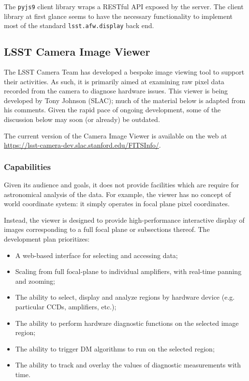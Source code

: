 The \texttt{pyjs9} client library wraps a RESTful API exposed by the server.
The client library at first glance seems to have the necessary functionality to implement most of the standard \texttt{lsst.afw.display} back end.


\subsection{LSST Camera Image Viewer}
\label{sec:existing_tools:camera}

The LSST Camera Team has developed a bespoke image viewing tool to support their activities.
As such, it is primarily aimed at examining raw pixel data recorded from the camera to diagnose hardware issues.
This viewer is being developed by Tony Johnson (SLAC); much of the material below is adapted from his comments.
Given the rapid pace of ongoing development, some of the discussion below may soon (or already) be outdated.

The current version of the Camera Image Viewer is available on the web at \url{https://lsst-camera-dev.slac.stanford.edu/FITSInfo/}.

\subsubsection{Capabilities}

Given its audience and goals, it does not provide facilities which are require for astronomical analysis of the data.
For example, the viewer has no concept of world coordinate system: it simply operates in focal plane pixel coordinates.

Instead, the viewer is designed to provide high-performance interactive display of images corresponding to a full focal plane or subsections thereof.
The development plan prioritizes:

\begin{itemize}

  \item{A web-based interface for selecting and accessing data;}
  \item{Scaling from full focal-plane to individual amplifiers, with real-time panning and zooming;}
  \item{The ability to select, display and analyze regions by hardware device (e.g. particular CCDs, amplifiers, etc.);}
  \item{The ability to perform hardware diagnostic functions on the selected image region;}
  \item{The ability to trigger DM algorithms to run on the selected region;}
  \item{The ability to track and overlay the values of diagnostic measurements with time.}

\end{itemize}

